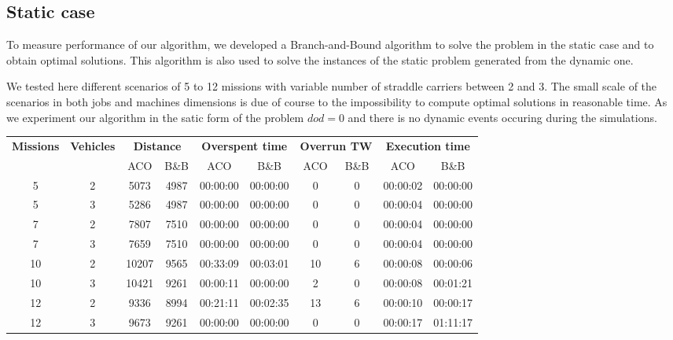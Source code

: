 \documentclass[a4paper,10pt]{article}
\begin{document}
	\subsection{Static case}
To measure performance of our algorithm, we developed a Branch-and-Bound algorithm to solve the problem in the static case and to obtain optimal solutions. This algorithm is also used to solve the instances of the static problem generated from the dynamic one.

  We tested here different scenarios of 5 to 12 missions with variable number of straddle carriers between 2 and 3. The small scale of the scenarios in both jobs and machines dimensions is due of course to the impossibility to compute optimal solutions in reasonable time.
  As we experiment our algorithm in the satic form of the problem $dod=0$ and there is no dynamic events occuring during the simulations.

\small
\begin{center}
  \begin{tabular}{|c|c|c|c|c|c|c|c|c|c|} 
\hline
\multirow{2}{*}{\bf{Missions}} & \multirow{2}{*}{\bf{Vehicles}} & \multicolumn{2}{|c|}{\bf{Distance}} & \multicolumn{2}{|c|}{\bf{Overspent time}} & \multicolumn{2}{|c|}{\bf{Overrun TW}} &  \multicolumn{2}{|c|}{\bf{Execution time}} \\\cline{3-10}
& & ACO & B\&B & ACO & B\&B & ACO & B\&B & ACO & B\&B\\ \hline
5	 & 2 	& 5073	& 4987	& 00:00:00	& 00:00:00 	& 0	& 0	& 00:00:02	& 00:00:00\\
5	 & 3 	& 5286	& 4987	& 00:00:00	& 00:00:00	& 0	& 0	& 00:00:04	& 00:00:00\\
7	 & 2	& 7807	& 7510	& 00:00:00	& 00:00:00	& 0	& 0	& 00:00:04	& 00:00:00\\
7	 & 3	& 7659	& 7510	& 00:00:00	& 00:00:00	& 0	& 0	& 00:00:04	& 00:00:00\\
10	 & 2	& 10207	& 9565	& 00:33:09	& 00:03:01	& 10	& 6	& 00:00:08	& 00:00:06\\
10	 & 3	& 10421	& 9261	& 00:00:11	& 00:00:00	& 2	& 0	& 00:00:08	& 00:01:21\\
12	 & 2	& 9336	& 8994	& 00:21:11	& 00:02:35	& 13	& 6	& 00:00:10	& 00:00:17\\
12	 & 3	& 9673	& 9261	& 00:00:00	& 00:00:00	& 0	& 0	& 00:00:17	& 01:11:17\\
\hline
\end{tabular}
\end{center}
\normalsize
\end{document}
